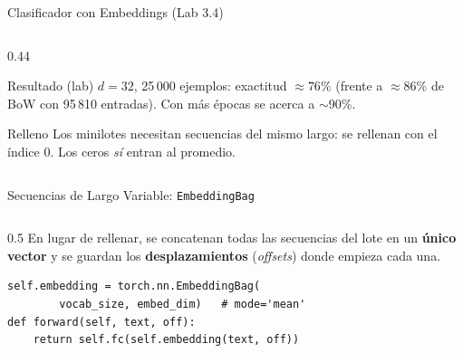 \documentclass[aspectratio=169, 10pt]{beamer}
\begin{document}
\begin{frame}{Clasificador con Embeddings (Lab 3.4)}
\begin{columns}[T]
\begin{column}{0.44\textwidth}
			\begin{block}{Resultado (lab)}
				\small
				$d=32$, 25\,000 ejemplos: exactitud $\approx 76\%$ (frente a $\approx 86\%$ de BoW con 95\,810 entradas). Con m\'as \'epocas se acerca a $\sim$90\%.
			\end{block}

			\begin{alertblock}{Relleno}
				\small
				Los minilotes necesitan secuencias del mismo largo: se rellenan con el \'indice 0. Los ceros \emph{s\'i} entran al promedio.
			\end{alertblock}
		\end{column}
	\end{columns}

\end{frame}

\begin{frame}[fragile]{Secuencias de Largo Variable: \texttt{EmbeddingBag}}

	\begin{columns}[T]
		\begin{column}{0.5\textwidth}
			\small
			En lugar de rellenar, se concatenan todas las secuencias del lote en un \textbf{\'unico vector} y se guardan los \textbf{desplazamientos} (\emph{offsets}) donde empieza cada una.

			\vspace{0.2cm}
			\centering

			\raggedright
			\begin{tcolorbox}[codebox]
\scriptsize
\begin{verbatim}
self.embedding = torch.nn.EmbeddingBag(
        vocab_size, embed_dim)   # mode='mean'
def forward(self, text, off):
    return self.fc(self.embedding(text, off))
\end{verbatim}
			\end{tcolorbox}
		\end{column}


\end{columns}
\end{frame}
\end{document}
